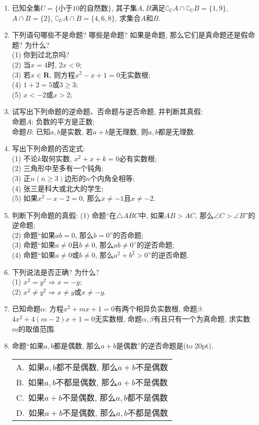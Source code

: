 \documentclass[10pt,a4paper]{article}
\newcommand{\bracket}[1]{(\hbox to #1pt{})}
\newcommand{\onech}[4]{\par\begin{tabular}{p{.9\textwidth}}
A.~#1\\
B.~#2\\
C.~#3\\
D.~#4
\end{tabular}}
\begin{document}
\begin{enumerate}[1.]
\item 已知全集$U=\{\text{小于}10\text{的自然数}\}$, 其子集$A,B$满足$\complement_UA\cap \complement_UB=\{1,9\}$, $A\cap B=\{2\}$, $\complement_UA\cap B=\{4,6,8\}$, 求集合$A$和$B$.
\item 下列语句哪些不是命题? 哪些是命题? 如果是命题, 那么它们是真命题还是假命题? 为什么?\\
(1) 你到过北京吗?\\
(2) 当$x=4$时, $2x<0$;\\
(3) 若$x\in \mathbf{R}$, 则方程$x^2-x+1=0$无实数根;\\
(4) $1+2=5$或$3\ge 3$;\\
(5) $x<-2$或$x>2$;\\
\item 试写出下列命题的逆命题、否命题与逆否命题, 并判断其真假:\\
命题$A$: 负数的平方是正数;\\
命题$B$: 已知$a,b$是实数, 若$a+b$是无理数, 则$a,b$都是无理数.
\item 写出下列命题的否定式:\\
(1) 不论$k$取何实数, $x^2+x+k=0$必有实数根;\\
(2) 三角形中至多有一个钝角;\\
(3) 正$n(n\ge 3)$边形的$n$个内角全相等;\\
(4) 张三是科大或北大的学生;\\
(5) 如果$x^2-x-2=0$, 那么$x\ne -1$且$x\ne -2$.
\item 判断下列命题的真假:
(1) 命题``在$\triangle ABC$中, 如果$AB>AC$, 那么$\angle C>\angle B$''的逆命题;\\
(2) 命题``如果$ab=0$, 那么$b=0$''的否命题;\\
(3) 命题``如果$a\ne 0$且$b\ne 0$, 那么$ab\ne 0$''的逆否命题;\\
(4) 命题``如果$a\ne 0$或$b\ne 0$, 那么$a^2+b^2>0$''的逆否命题.
\item 下列说法是否正确? 为什么?\\
(1) $x^2=y^2\Rightarrow x=-y$;\\
(2) $x^2\ne y^2\Rightarrow x\ne y$或$x\ne -y$.
\item 已知命题$\alpha$: 方程$x^2+mx+1=0$有两个相异负实数根, 命题$\beta$: $4x^2+4(m-2)x+1=0$无实数根, 命题$\alpha,\beta$有且只有一个为真命题, 求实数$m$的取值范围.
\item 命题``如果$a,b$都是偶数, 那么$a+b$是偶数''的逆否命题是\bracket{20}.
\onech{如果$a,b$都不是偶数, 那么$a+b$不是偶数}{如果$a,b$不都是偶数, 那么$a+b$不是偶数}{如果$a+b$不是偶数, 那么$a,b$都不是偶数}{如果$a+b$不是偶数, 那么$a,b$不都是偶数}

\end{enumerate}
\end{document}
